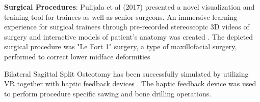 \textbf{Surgical Procedures}: Pulijala et al (2017) presented a novel visualization and training tool for trainees as well as senior surgeons.
An immersive learning experience for surgical trainees through pre-recorded stereoscopic 3D videos of surgery and interactive models of patient’s anatomy was created \cite{Pulijala.2017}.
The depicted surgical procedure was "Le Fort 1" surgery, a type of maxillofacial surgery, performed to correct lower midface deformities \cite{Pulijala.2017}

Bilateral Sagittal Split Osteotomy has been successfully simulated by utilizing VR together with haptic feedback devices \cite{VenkataS.Arikatla.2018}.
The haptic feedback device was used to perform procedure specific sawing and bone drilling operations.
